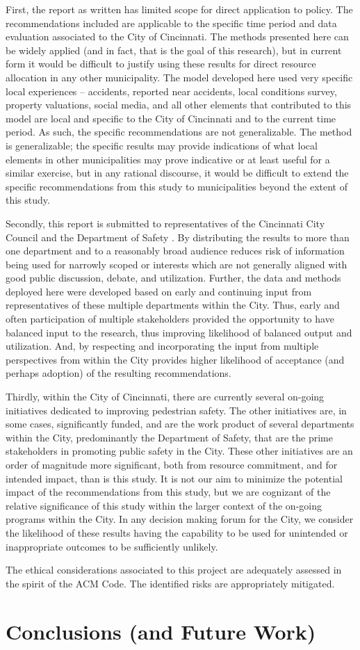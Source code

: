 \documentclass{llncs}
\begin{document}
First, the report as written has limited scope for direct application to policy. The recommendations included are applicable to the specific time period and data evaluation associated to the City of Cincinnati. The methods presented here can be widely applied (and in fact, that is the goal of this research), but in current form it would be difficult to justify using these results for direct resource allocation in any other municipality. The model developed here used very specific local experiences – accidents, reported near accidents, local conditions survey, property valuations, social media, and all other elements that contributed to this model are local and specific to the City of Cincinnati and to the current time period. As such, the specific recommendations are not generalizable. The method is generalizable; the specific results may provide indications of what local elements in other municipalities may prove indicative or at least useful for a similar exercise, but in any rational discourse, it would be difficult to extend the specific recommendations from this study to municipalities beyond the extent of this study.

Secondly, this report is submitted to representatives of the Cincinnati City Council and the Department of Safety . By distributing the results to more than one department and to a reasonably broad audience reduces risk of information being used for narrowly scoped  or interests which are not generally aligned with good public discussion, debate, and utilization. Further, the data and methods deployed here were developed based on early and continuing input from representatives of these multiple departments within the City. Thus, early and often participation of multiple stakeholders provided the opportunity to have balanced input to the research, thus improving likelihood of balanced output and utilization. And, by respecting and incorporating the input from multiple perspectives from within the City provides higher likelihood of acceptance (and perhaps adoption) of the resulting recommendations.

Thirdly, within the City of Cincinnati, there are currently several on-going initiatives dedicated to improving pedestrian safety. The other initiatives are, in some cases, significantly funded, and are the work product of several departments within the City, predominantly the Department of Safety, that are the prime stakeholders in promoting public safety in the City. These other initiatives are an order of magnitude more significant, both from resource commitment, and for intended impact, than is this study. It is not our aim to minimize the potential impact of the recommendations from this study, but we are cognizant of the relative significance of this study within the larger context of the on-going programs within the City. In any decision making forum for the City, we consider the likelihood of these results having the capability to be used for unintended or inappropriate outcomes to be sufficiently unlikely.

The ethical considerations associated to this project are adequately assessed in the spirit of the ACM Code. The identified risks are appropriately mitigated.
%
\section{Conclusions (and Future Work)}
%

%
%


\end{document}
